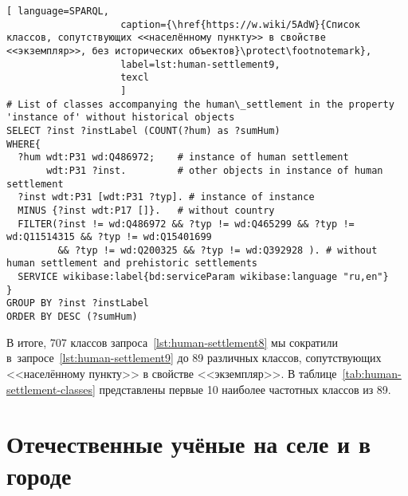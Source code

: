 \begin{fullwidth}
\lstset{numbers=left, firstnumber=1, frame=single}
\begin{lstlisting}[ language=SPARQL, 
                    caption={\href{https://w.wiki/5AdW}{Cписок классов, сопутствующих <<населённому пункту>> в свойстве <<экземпляр>>, без исторических объектов}\protect\footnotemark},
                    label=lst:human-settlement9,
                    texcl 
                    ]
# List of classes accompanying the human\_settlement in the property 'instance of' without historical objects 
SELECT ?inst ?instLabel (COUNT(?hum) as ?sumHum)
WHERE{
  ?hum wdt:P31 wd:Q486972;    # instance of human settlement
       wdt:P31 ?inst.         # other objects in instance of human settlement
  ?inst wdt:P31 [wdt:P31 ?typ]. # instance of instance
  MINUS {?inst wdt:P17 []}.   # without country
  FILTER(?inst != wd:Q486972 && ?typ != wd:Q465299 && ?typ != wd:Q11514315 && ?typ != wd:Q15401699 
         && ?typ != wd:Q200325 && ?typ != wd:Q392928 ). # without human settlement and prehistoric settlements
  SERVICE wikibase:label{bd:serviceParam wikibase:language "ru,en"}
}
GROUP BY ?inst ?instLabel
ORDER BY DESC (?sumHum)
\end{lstlisting}%
\end{fullwidth}

В итоге, 707 классов запроса~\ref{lst:human-settlement8} 
мы сократили в~запросе~\ref{lst:human-settlement9} 
до 89 различных классов, сопутствующих <<населённому пункту>> в свойстве <<экземпляр>>. 
В таблице~\ref{tab:human-settlement-classes} представлены первые 10 наиболее частотных классов из 89. 


\newpage

\section{Отечественные учёные на селе и в городе}

